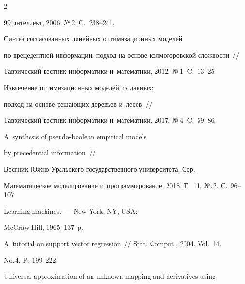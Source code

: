 \begin{multicols}{2}
{{\begin{thebibliography}{99}
интеллект, 2006. №\,2. C.~238--241.







 Синтез согласованных  линейных оптимизационных моделей  


по прецедентной информации: подход на основе колмогоровской сложности~// 


Таврический вестник информатики и~математики, 2012. №\,1. C.~13--25.







  Извлечение оптимизационных моделей из данных: 


подход на основе решающих деревьев и~лесов~// 


Таврический вестник информатики и~математики, 2017. №\,4. C.~59--86.







 A~synthesis of pseudo-boolean empirical models 


by precedential information~// 


Вестник Юж\-но-Ураль\-ско\-го государственного университета. Сер.


 Математическое моделирование и~программирование, 2018. Т.~11. №.\,2. С.~96--107.










 Learning machines.~--- New York, NY, USA: 


McGraw-Hill, 1965. 137~p.









A~tutorial on support vector regression~// Stat. Comput., 2004. Vol.~14. 


No.\,4. P.~199--222.









Universal approximation of an unknown mapping and derivatives using 



\end{thebibliography}}}
\end{multicols}
